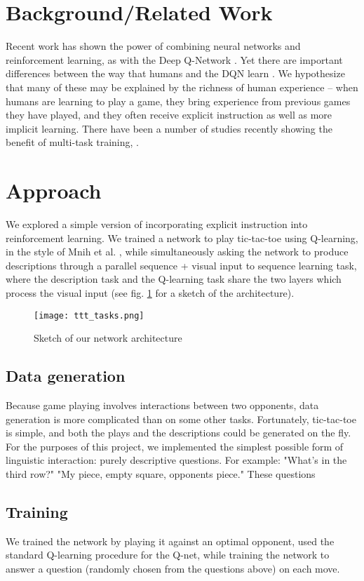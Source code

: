 \documentclass{article} %
\begin{document}
\section{Background/Related Work}
Recent work has shown the power of combining neural networks and reinforcement learning, as with the Deep Q-Network \cite{Mnih2015}. Yet there are important differences between the way that humans and the DQN learn \cite{Lake2016}. We hypothesize that many of these may be explained by the richness of human experience -- when humans are learning to play a game, they bring experience from previous games they have played, and they often receive explicit instruction as well as more implicit learning. There have been a number of studies recently showing the benefit of multi-task training, \cite[e.g.]{Luong2016}.

\section{Approach}
We explored a simple version of incorporating explicit instruction into reinforcement learning. We trained a network to play tic-tac-toe using Q-learning, in the style of Mnih et al. \cite{Mnih2015}, while simultaneously asking the network to produce descriptions through a parallel sequence + visual input to sequence learning task, where the description task and the Q-learning task share the two layers which process the visual input (see fig. \ref{network_diagram} for a sketch of the architecture).  
\begin{figure}
\centering
\texttt{[image: ttt\_tasks.png]}
\caption{Sketch of our network architecture}
\label{network_diagram}
\end{figure}

\subsection{Data generation}
Because game playing involves interactions between two opponents, data generation is more complicated than on some other tasks. Fortunately, tic-tac-toe is simple, and both the plays and the descriptions could be generated on the fly. For the purposes of this project, we implemented the simplest possible form of linguistic interaction: purely descriptive questions. For example: "What's in the third row?" "My piece, empty square, opponents piece." These questions

\subsection{Training}
We trained the network by playing it against an optimal opponent, used the standard Q-learning procedure for the Q-net, while training the network to answer a question (randomly chosen from the questions above) on each move.
\end{document}
